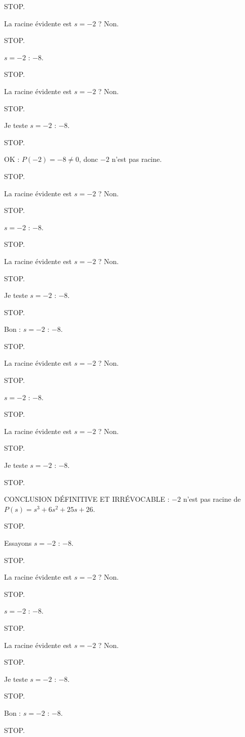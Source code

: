 \documentclass[11pt]{article}
\begin{document}
\begin{exoresolu}
\begin{enumerate}
STOP. 

La racine évidente est $s = -2$ ? Non. 

STOP. 

$s = -2$ : $-8$. 

STOP. 

La racine évidente est $s = -2$ ? Non. 

STOP. 

Je teste $s = -2$ : $-8$. 

STOP. 

OK : $P(-2) = -8 \neq 0$, donc $-2$ n'est pas racine. 

STOP. 

La racine évidente est $s = -2$ ? Non. 

STOP. 

$s = -2$ : $-8$. 

STOP. 

La racine évidente est $s = -2$ ? Non. 

STOP. 

Je teste $s = -2$ : $-8$. 

STOP. 

Bon : $s = -2$ : $-8$. 

STOP. 

La racine évidente est $s = -2$ ? Non. 

STOP. 

$s = -2$ : $-8$. 

STOP. 

La racine évidente est $s = -2$ ? Non. 

STOP. 

Je teste $s = -2$ : $-8$. 

STOP. 

CONCLUSION DÉFINITIVE ET IRRÉVOCABLE : $-2$ n'est pas racine de $P(s) = s^3 + 6s^2 + 25s + 26$. 

STOP. 

Essayons $s = -2$ : $-8$. 

STOP. 

La racine évidente est $s = -2$ ? Non. 

STOP. 

$s = -2$ : $-8$. 

STOP. 

La racine évidente est $s = -2$ ? Non. 

STOP. 

Je teste $s = -2$ : $-8$. 

STOP. 

Bon : $s = -2$ : $-8$. 

STOP. 


\end{enumerate}
\end{exoresolu}
\end{document}
